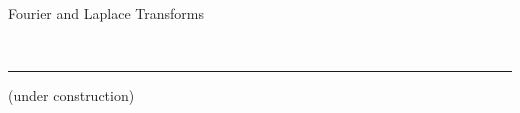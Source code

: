 \documentclass{article}
\makeatletter
\newcommand{\header}[1]{\begin{large}\noindent #1\end{large}\\\rule{\textwidth}{0.5pt}}
\newcommand{\sheader}[1]{\underline{#1:}}
\newcommand{\subcell}[2]{\begin{tabular}{@{}c@{}}#1 \\ #2\end{tabular}}
\makeatother
\begin{document}
    \header{Fourier and Laplace Transforms} 
    (under construction)









    \egroup
\end{document}

